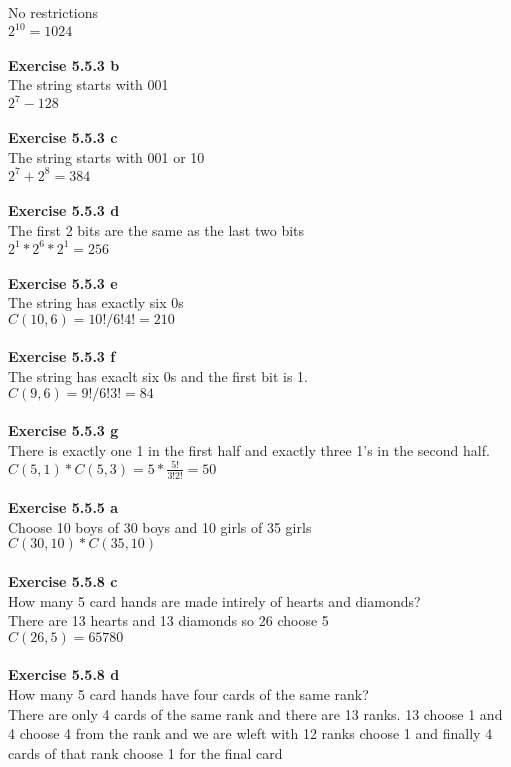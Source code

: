 \documentclass{article}
\begin{document}
No restrictions\\
$2^{10} = 1024$\\\\
\textbf{Exercise 5.5.3 b}\\
The string starts with 001\\
$2^7 - 128$\\\\
\textbf{Exercise 5.5.3 c}\\
The string starts with 001 or 10\\
$2^7 + 2^8 = 384$\\\\
\textbf{Exercise 5.5.3 d}\\
The first 2 bits are the same as the last two bits\\
$2^1 * 2^6 * 2^1 = 256$\\\\
\textbf{Exercise 5.5.3 e}\\
The string has exactly six 0s\\
$C(10,6) = 10! / 6!4! = 210$\\\\
\textbf{Exercise 5.5.3 f}\\
The string has exaclt six 0s and the first bit is 1.\\
$C(9,6) = 9!/6!3! = 84$\\\\
\textbf{Exercise 5.5.3 g}\\
There is exactly one 1 in the first half and exactly three 1's in the second half.\\
$C(5,1) * C(5,3) = 5 * \frac{5!}{3!2!} = 50$\\\\
\textbf{Exercise 5.5.5 a}\\
Choose 10 boys of 30 boys and 10 girls of 35 girls\\
$C(30,10) * C(35,10)$\\\\
\textbf{Exercise 5.5.8 c}\\
How many 5 card hands are made intirely of hearts and diamonds?\\
There are 13 hearts and 13 diamonds so 26 choose 5\\
$C(26,5) = 65780$\\\\
\textbf{Exercise 5.5.8 d}\\
How many 5 card hands have four cards of the same rank?\\
There are only 4 cards of the same rank and there are 13 ranks. 13 choose 1 and 4 choose 4 from the rank and we are wleft with 12 ranks choose 1 and finally 4 cards of that rank choose 1 for the final card\\
\end{document}
